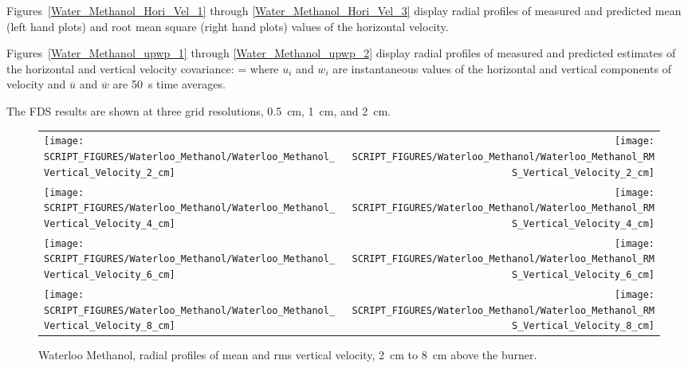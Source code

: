 Figures~\ref{Water_Methanol_Hori_Vel_1} through \ref{Water_Methanol_Hori_Vel_3} display radial profiles of measured and predicted mean (left hand plots) and root mean square (right hand plots) values of the horizontal velocity.

Figures~\ref{Water_Methanol_upwp_1} through \ref{Water_Methanol_upwp_2} display radial profiles of measured and predicted estimates of the horizontal and vertical velocity covariance:
\be
    = 
\ee
where $u_i$ and $w_i$ are instantaneous values of the horizontal and vertical components of velocity and $\overline{u}$ and $\overline{w}$ are 50~s time averages.

The FDS results are shown at three grid resolutions, 0.5~cm, 1~cm, and 2~cm.



\begin{figure}[p]
\begin{tabular*}{\textwidth}{l@{\extracolsep{\fill}}r}
\texttt{[image: SCRIPT\_FIGURES/Waterloo\_Methanol/Waterloo\_Methanol\_Vertical\_Velocity\_2\_cm]} &
\texttt{[image: SCRIPT\_FIGURES/Waterloo\_Methanol/Waterloo\_Methanol\_RMS\_Vertical\_Velocity\_2\_cm]} \\
\texttt{[image: SCRIPT\_FIGURES/Waterloo\_Methanol/Waterloo\_Methanol\_Vertical\_Velocity\_4\_cm]} &
\texttt{[image: SCRIPT\_FIGURES/Waterloo\_Methanol/Waterloo\_Methanol\_RMS\_Vertical\_Velocity\_4\_cm]} \\
\texttt{[image: SCRIPT\_FIGURES/Waterloo\_Methanol/Waterloo\_Methanol\_Vertical\_Velocity\_6\_cm]} &
\texttt{[image: SCRIPT\_FIGURES/Waterloo\_Methanol/Waterloo\_Methanol\_RMS\_Vertical\_Velocity\_6\_cm]} \\
\texttt{[image: SCRIPT\_FIGURES/Waterloo\_Methanol/Waterloo\_Methanol\_Vertical\_Velocity\_8\_cm]} &
\texttt{[image: SCRIPT\_FIGURES/Waterloo\_Methanol/Waterloo\_Methanol\_RMS\_Vertical\_Velocity\_8\_cm]}
\end{tabular*}
\caption[Waterloo Methanol, radial mean and rms vert.~vel., 2~cm to 8~cm above burner]
{Waterloo Methanol, radial profiles of mean and rms vertical velocity, 2~cm to 8~cm above the burner.}
\label{Water_Methanol_Vert_Vel_1}
\end{figure}


